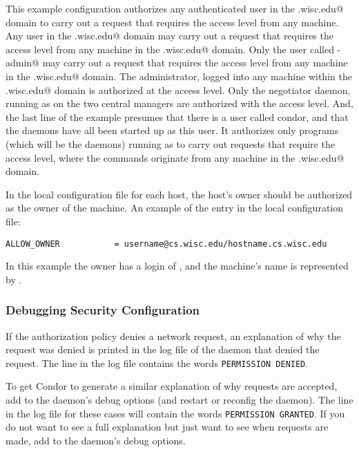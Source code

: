 This example configuration authorizes
any authenticated user in the 
\verb@cs.wisc.edu@ domain to 
carry out a request that requires the 
 access level
from any machine.
Any user in the 
\verb@cs.wisc.edu@ domain may 
carry out a request that requires the 
 access level
from any machine in the
\verb@cs.wisc.edu@ domain.
Only the user called \verb@condor-admin@ may 
carry out a request that requires the 
 access level
from any machine in the
\verb@cs.wisc.edu@ domain.
The administrator, logged into any machine within
the \verb@cs.wisc.edu@ domain is authorized at the
 access level.
Only the negotiator daemon, running as
\verb@condor@ on the two central managers
are authorized 
with the
 access level.
And, the last line of the example presumes that there is a
user called condor, and that the daemons have all been started
up as this user.
It authorizes only programs (which will be the daemons)
running as 
\verb@condor@ to
carry out requests that require the 
 access level,
where the commands originate from
any machine in the
\verb@cs.wisc.edu@ domain.

In the local configuration file for each host, the host's
owner should be authorized
as the owner of the machine.
An example of the entry in the local configuration file:
\footnotesize
\begin{verbatim}
ALLOW_OWNER           = username@cs.wisc.edu/hostname.cs.wisc.edu
\end{verbatim}
\normalsize
In this example the owner has a login of
\verb@username@, and the machine's name is represented by
\verb@hostname@.

\subsubsection{\label{sec:Security-Debugging} Debugging Security Configuration}

If the authorization policy denies a network request, an explanation
of why the request was denied is printed in the log file of the daemon
that denied the request.  The line in the log file contains the words
\verb|PERMISSION DENIED|.

To get Condor to generate a similar explanation of why requests are
accepted, add  to the daemon's debug options (and
restart or reconfig the daemon).  The line in the log file for these
cases will contain the words \verb|PERMISSION GRANTED|.  If you do not
want to see a full explanation but just want to see when requests
are made, add  to the daemon's debug options.

